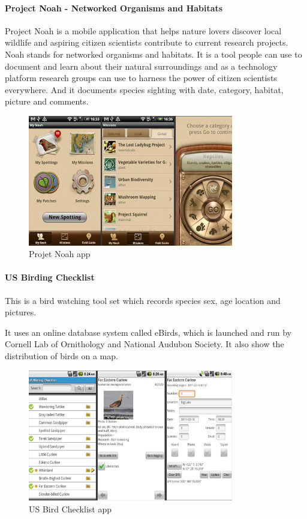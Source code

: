 \paragraph{Project Noah - Networked Organisms and Habitats}

Project Noah is a mobile application that helps nature lovers discover local
wildlife and aspiring citizen scientists contribute to current research
projects. Noah stands for networked organisms and habitats. It is a tool people
can use to document and learn about their  natural surroundings and as a
technology platform research groups can  use to harness the power of citizen
scientists everywhere. And it documents species sighting with date, category,
habitat, picture and comments\cite{similarproduct:noah}. 

\begin{figure}[htb]
    \centering
    \includegraphics[width=0.8\textwidth]{introduction/project_description/noah.png}
    \caption{Projet Noah app}
    \label{fig:Noahapp}
\end{figure}

\paragraph{US Birding Checklist}
This is a bird watching tool set which records species sex, age location and
pictures\cite{similarproduct:usbird}.

It uses an online database system called eBirds\cite{similarproduct:ebird},
which is launched and run by Cornell Lab of Ornithology and National Audubon
Society. It also show the distribution of birds on a map. 

\begin{figure}[htb]
    \centering
    \includegraphics[width=0.8\textwidth]{introduction/project_description/usbirdingchecklist.png}
    \caption{US Bird Checklist app}
    \label{fig:usbirdapp}
\end{figure}

